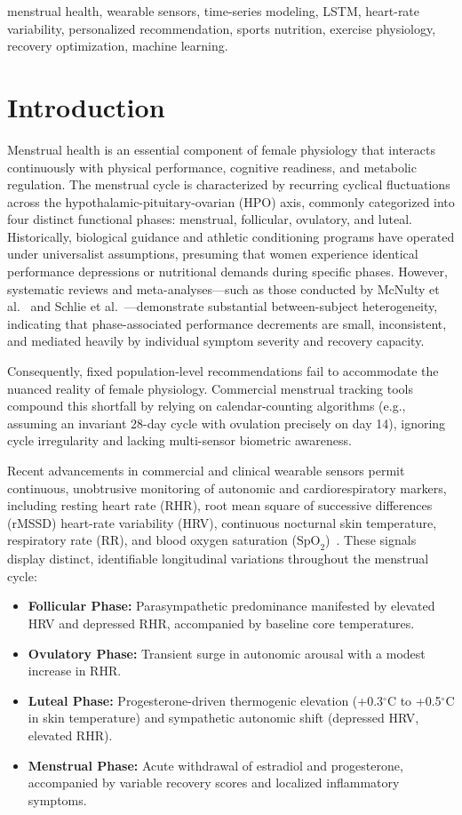 \documentclass[conference]{IEEEtran}
\begin{document}
\begin{IEEEkeywords}
menstrual health, wearable sensors, time-series modeling, LSTM, heart-rate variability, personalized recommendation, sports nutrition, exercise physiology, recovery optimization, machine learning.
\end{IEEEkeywords}

\section{Introduction}
Menstrual health is an essential component of female physiology that interacts continuously with physical performance, cognitive readiness, and metabolic regulation. The menstrual cycle is characterized by recurring cyclical fluctuations across the hypothalamic-pituitary-ovarian (HPO) axis, commonly categorized into four distinct functional phases: menstrual, follicular, ovulatory, and luteal. Historically, biological guidance and athletic conditioning programs have operated under universalist assumptions, presuming that women experience identical performance depressions or nutritional demands during specific phases. However, systematic reviews and meta-analyses—such as those conducted by McNulty et al.~\cite{mcnulty2020} and Schlie et al.~\cite{schlie2025}—demonstrate substantial between-subject heterogeneity, indicating that phase-associated performance decrements are small, inconsistent, and mediated heavily by individual symptom severity and recovery capacity.

Consequently, fixed population-level recommendations fail to accommodate the nuanced reality of female physiology. Commercial menstrual tracking tools compound this shortfall by relying on calendar-counting algorithms (e.g., assuming an invariant 28-day cycle with ovulation precisely on day 14), ignoring cycle irregularity and lacking multi-sensor biometric awareness.

Recent advancements in commercial and clinical wearable sensors permit continuous, unobtrusive monitoring of autonomic and cardiorespiratory markers, including resting heart rate (RHR), root mean square of successive differences (rMSSD) heart-rate variability (HRV), continuous nocturnal skin temperature, respiratory rate (RR), and blood oxygen saturation ($\text{SpO}_2$)~\cite{smarr2026}. These signals display distinct, identifiable longitudinal variations throughout the menstrual cycle:
\begin{itemize}
    \item \textbf{Follicular Phase:} Parasympathetic predominance manifested by elevated HRV and depressed RHR, accompanied by baseline core temperatures.
    \item \textbf{Ovulatory Phase:} Transient surge in autonomic arousal with a modest increase in RHR.
    \item \textbf{Luteal Phase:} Progesterone-driven thermogenic elevation (+0.3$^\circ$C to +0.5$^\circ$C in skin temperature) and sympathetic autonomic shift (depressed HRV, elevated RHR).
    \item \textbf{Menstrual Phase:} Acute withdrawal of estradiol and progesterone, accompanied by variable recovery scores and localized inflammatory symptoms.
\end{itemize}
\end{document}
